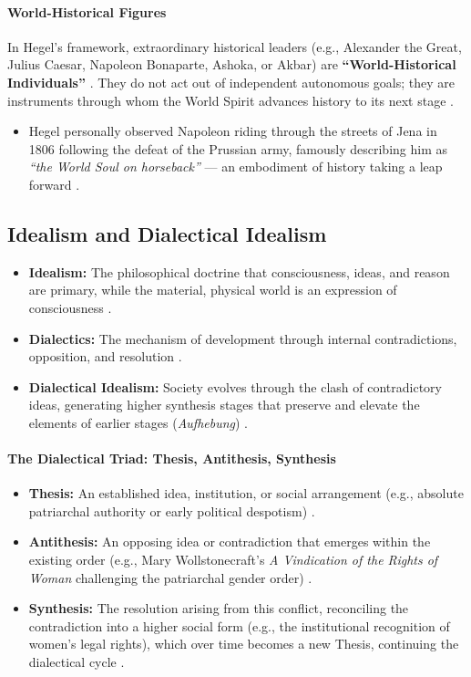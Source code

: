 \paragraph{World-Historical Figures}
In Hegel's framework, extraordinary historical leaders (e.g., Alexander the Great, Julius Caesar, Napoleon Bonaparte, Ashoka, or Akbar) are \textbf{``World-Historical Individuals''} . They do not act out of independent autonomous goals; they are instruments through whom the World Spirit advances history to its next stage .
\begin{itemize}
    \item Hegel personally observed Napoleon riding through the streets of Jena in 1806 following the defeat of the Prussian army, famously describing him as \textit{``the World Soul on horseback''} --- an embodiment of history taking a leap forward .
\end{itemize}

\subsection{Idealism and Dialectical Idealism}

\begin{KeyConcept}
\begin{itemize}
    \item \textbf{Idealism:} The philosophical doctrine that consciousness, ideas, and reason are primary, while the material, physical world is an expression of consciousness .
    \item \textbf{Dialectics:} The mechanism of development through internal contradictions, opposition, and resolution .
    \item \textbf{Dialectical Idealism:} Society evolves through the clash of contradictory ideas, generating higher synthesis stages that preserve and elevate the elements of earlier stages (\textit{Aufhebung}) .
\end{itemize}
\end{KeyConcept}

\paragraph{The Dialectical Triad: Thesis, Antithesis, Synthesis}
\begin{itemize}
    \item \textbf{Thesis:} An established idea, institution, or social arrangement (e.g., absolute patriarchal authority or early political despotism) .
    \item \textbf{Antithesis:} An opposing idea or contradiction that emerges within the existing order (e.g., Mary Wollstonecraft's \textit{A Vindication of the Rights of Woman} challenging the patriarchal gender order) .
    \item \textbf{Synthesis:} The resolution arising from this conflict, reconciling the contradiction into a higher social form (e.g., the institutional recognition of women's legal rights), which over time becomes a new Thesis, continuing the dialectical cycle .
\end{itemize}

